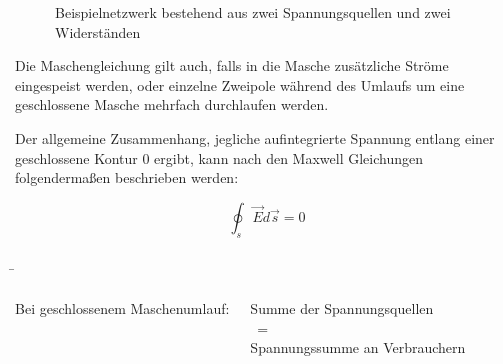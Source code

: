 \begin{frame}
{		\begin{figure}[h!]
			\begin{center}

			\end{center}
			\caption{Beispielnetzwerk bestehend aus zwei Spannungsquellen und zwei Widerständen}
			\label{fig:masche}
		\end{figure}

		Die Maschengleichung gilt auch, falls in die Masche zusätzliche Ströme eingespeist werden,
		oder einzelne Zweipole während des Umlaufs um eine geschlossene Masche mehrfach durchlaufen werden.

		Der allgemeine Zusammenhang, jegliche aufintegrierte Spannung entlang einer geschlossene Kontur 0 ergibt, kann
		nach den Maxwell Gleichungen folgendermaßen beschrieben werden:

		\begin{equation}
			\oint_{s} \vec{E} d\vec{s} = 0
		\end{equation}



	}


	\b{
		\begin{columns}

			\vspace{-70pt}

			Bei geschlossenem Maschenumlauf:
			\vspace{-5pt}
			\begin{Merksatz}{}

				\begin{center}


					Summe der Spannungsquellen\\
					\quad \quad\ \quad =\\
					Spannungssumme an Verbrauchern

				\end{center}
			\end{Merksatz}


\end{columns}}
\end{frame}
